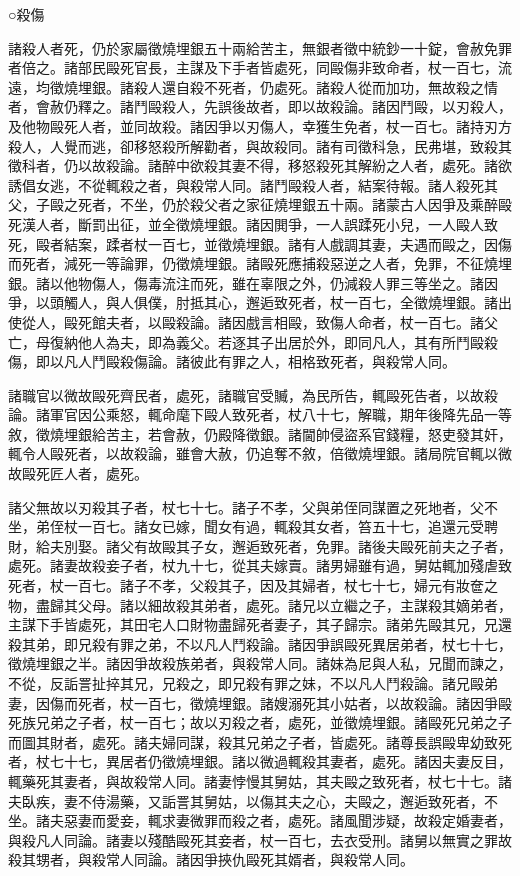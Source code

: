 \begin{pinyinscope}
 ○殺傷



 諸殺人者死，仍於家屬徵燒埋銀五十兩給苦主，無銀者徵中統鈔一十錠，會赦免罪者倍之。諸部民毆死官長，主謀及下手者皆處死，同毆傷非致命者，杖一百七，流遠，均徵燒埋銀。諸殺人還自殺不死者，仍處死。諸殺人從而加功，無故殺之情者，會赦仍釋之。諸鬥毆殺人，先誤後故者，即以故殺論。諸因鬥毆，以刃殺人，及他物毆死人者，並同故殺。諸因爭以刃傷人，幸獲生免者，杖一百七。諸持刃方殺人，人覺而逃，卻移怒殺所解勸者，與故殺同。諸有司徵科急，民弗堪，致殺其徵科者，仍以故殺論。諸醉中欲殺其妻不得，移怒殺死其解紛之人者，處死。諸欲誘倡女逃，不從輒殺之者，與殺常人同。諸鬥毆殺人者，結案待報。諸人殺死其父，子毆之死者，不坐，仍於殺父者之家征燒埋銀五十兩。諸蒙古人因爭及乘醉毆死漢人者，斷罰出征，並全徵燒埋銀。諸因閧爭，一人誤蹂死小兒，一人毆人致死，毆者結案，蹂者杖一百七，並徵燒埋銀。諸有人戲調其妻，夫遇而毆之，因傷而死者，減死一等論罪，仍徵燒埋銀。諸毆死應捕殺惡逆之人者，免罪，不征燒埋銀。諸以他物傷人，傷毒流注而死，雖在辜限之外，仍減殺人罪三等坐之。諸因爭，以頭觸人，與人俱僕，肘抵其心，邂逅致死者，杖一百七，全徵燒埋銀。諸出使從人，毆死館夫者，以毆殺論。諸因戲言相毆，致傷人命者，杖一百七。諸父亡，母復納他人為夫，即為義父。若逐其子出居於外，即同凡人，其有所鬥毆殺傷，即以凡人鬥毆殺傷論。諸彼此有罪之人，相格致死者，與殺常人同。



 諸職官以微故毆死齊民者，處死，諸職官受贓，為民所告，輒毆死告者，以故殺論。諸軍官因公乘怒，輒命麾下毆人致死者，杖八十七，解職，期年後降先品一等敘，徵燒埋銀給苦主，若會赦，仍殿降徵銀。諸閫帥侵盜系官錢糧，怒吏發其奸，輒令人毆死者，以故殺論，雖會大赦，仍追奪不敘，倍徵燒埋銀。諸局院官輒以微故毆死匠人者，處死。



 諸父無故以刃殺其子者，杖七十七。諸子不孝，父與弟侄同謀置之死地者，父不坐，弟侄杖一百七。諸女已嫁，聞女有過，輒殺其女者，笞五十七，追還元受聘財，給夫別娶。諸父有故毆其子女，邂逅致死者，免罪。諸後夫毆死前夫之子者，處死。諸妻故殺妾子者，杖九十七，從其夫嫁賣。諸男婦雖有過，舅姑輒加殘虐致死者，杖一百七。諸子不孝，父殺其子，因及其婦者，杖七十七，婦元有妝奩之物，盡歸其父母。諸以細故殺其弟者，處死。諸兄以立繼之子，主謀殺其嫡弟者，主謀下手皆處死，其田宅人口財物盡歸死者妻子，其子歸宗。諸弟先毆其兄，兄還殺其弟，即兄殺有罪之弟，不以凡人鬥殺論。諸因爭誤毆死異居弟者，杖七十七，徵燒埋銀之半。諸因爭故殺族弟者，與殺常人同。諸妹為尼與人私，兄聞而諫之，不從，反詬詈扯捽其兄，兄殺之，即兄殺有罪之妹，不以凡人鬥殺論。諸兄毆弟妻，因傷而死者，杖一百七，徵燒埋銀。諸嫂溺死其小姑者，以故殺論。諸因爭毆死族兄弟之子者，杖一百七；故以刃殺之者，處死，並徵燒埋銀。諸毆死兄弟之子而圖其財者，處死。諸夫婦同謀，殺其兄弟之子者，皆處死。諸尊長誤毆卑幼致死者，杖七十七，異居者仍徵燒埋銀。諸以微過輒殺其妻者，處死。諸因夫妻反目，輒藥死其妻者，與故殺常人同。諸妻悖慢其舅姑，其夫毆之致死者，杖七十七。諸夫臥疾，妻不侍湯藥，又詬詈其舅姑，以傷其夫之心，夫毆之，邂逅致死者，不坐。諸夫惡妻而愛妾，輒求妻微罪而殺之者，處死。諸風聞涉疑，故殺定婚妻者，與殺凡人同論。諸妻以殘酷毆死其妾者，杖一百七，去衣受刑。諸舅以無實之罪故殺其甥者，與殺常人同論。諸因爭挾仇毆死其婿者，與殺常人同。




\end{pinyinscope}
